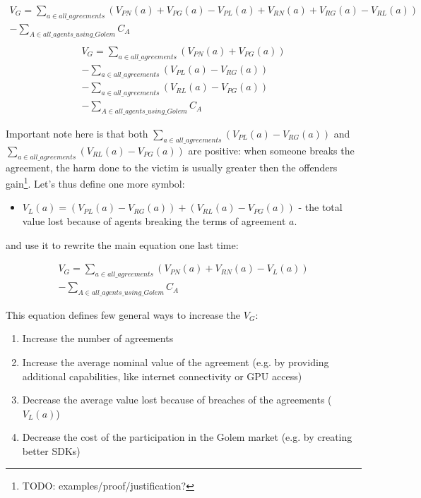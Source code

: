 \documentclass{article}
\begin{document}
\begin{equation}
\begin{split}
    V_G = \sum_{a \in all\_agreements}(V_{PN}(a) + V_{PG}(a) - V_{PL}(a) + V_{RN}(a) + V_{RG}(a) - V_{RL}(a)) \\
            - \sum_{A \in all\_agents\_using\_Golem}C_A \\
\end{split}
\end{equation}
\begin{equation}
\begin{split}
    V_G = \sum_{a \in all\_agreements}(V_{PN}(a) + V_{PG}(a)) \\
          - \sum_{a \in all\_agreements}(V_{PL}(a)- V_{RG}(a)) \\
          - \sum_{a \in all\_agreements}(V_{RL}(a)- V_{PG}(a)) \\
          - \sum_{A \in all\_agents\_using\_Golem}C_A
\end{split}
\end{equation}

Important note here is that both $\sum_{a \in all\_agreements}(V_{PL}(a)- V_{RG}(a))$ and $\sum_{a \in all\_agreements}(V_{RL}(a)- V_{PG}(a))$ are positive: 
when someone breaks the agreement, the harm done to the victim is usually greater then the offenders gain\footnote{TODO: examples/proof/justification?}.
Let's thus define one more symbol:
\begin{itemize}
\item{$V_L(a) = (V_{PL}(a)- V_{RG}(a)) + (V_{RL}(a)- V_{PG}(a))$ - the total value lost because of agents breaking the terms of agreement $a$.}
\end{itemize}
and use it to rewrite the main equation one last time:

\begin{equation}
\begin{split}
    V_G = \sum_{a \in all\_agreements}(V_{PN}(a) + V_{RN}(a) - V_L(a)) \\
          - \sum_{A \in all\_agents\_using\_Golem}C_A
\end{split}
\end{equation}

This equation defines few general ways to increase the $V_G$:

\begin{enumerate}
\item Increase the number of agreements
\item Increase the average nominal value of the agreement (e.g. by providing additional capabilities, like internet connectivity or GPU access)
\item Decrease the average value lost because of breaches of the agreements ($V_L(a)$)
\item Decrease the cost of the participation in the Golem market (e.g. by creating better SDKs)
\end{enumerate}
\end{document}
